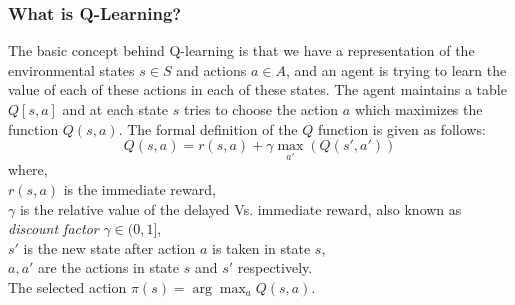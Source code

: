 \documentclass[12pt]{report}
\begin{document}
\subsubsection{What is Q-Learning?} 
The basic concept behind Q-learning is that we have a representation of the environmental states $s \in S$ and actions $a \in A$, and an agent is trying to learn the value of each of these actions in each of these states. The agent maintains a table $Q[s,a]$ and at each state $s$ tries to choose the action $a$ which maximizes the function $Q(s,a)$. The formal definition of the $Q$ function is given as follows:
\begin{equation} \label{q_function}
Q(s,a) = r(s,a) + \gamma \max_{a'}(Q(s',a'))
\end{equation}
where,\\
$r(s,a)$ is the immediate reward,\\
$\gamma$ is the relative value of the delayed Vs. immediate reward, also known as \textit{discount factor} $ \gamma \in (0,1]$,\\
$s'$ is the new state after action $a$ is taken in state $s$,\\
$a,a'$ are the actions in state $s$ and $s'$ respectively.\\
The selected action $\pi(s) = \arg\max_a Q(s,a)$.\\
\pagebreak
\end{document}
